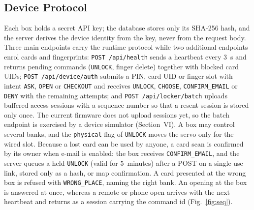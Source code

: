 \documentclass[journal,onecolumn]{IEEEtran}
\begin{document}
\subsection{Device Protocol}

Each box holds a secret API key; the database stores only its SHA-256 hash, and the server derives the device
identity from the key, never from the request body. Three main endpoints carry the runtime protocol while two additional
endpoints enrol cards and fingerprints: \texttt{POST /api/health} sends a heartbeat every 3~s and returns pending
commands (\texttt{UNLOCK}, finger delete) together with blocked card UIDs; \texttt{POST /api/device/auth} submits a PIN,
card UID or finger slot with intent \texttt{ASK}, \texttt{OPEN} or \texttt{CHECKOUT} and receives \texttt{UNLOCK},
\texttt{CHOOSE}, \texttt{CONFIRM\_EMAIL} or \texttt{DENY} with the remaining attempts; and
\texttt{POST /api/locker/batch} uploads buffered access sessions with a sequence number so that a resent session is
stored only once. The current firmware does not upload sessions yet, so the batch endpoint is exercised by a device
simulator (Section~VI). A box may control several banks, and the \texttt{physical} flag of \texttt{UNLOCK} moves the
servo only for the wired slot. Because a lost card can be used by anyone, a card scan is confirmed by its owner when
e-mail is enabled: the box receives \texttt{CONFIRM\_EMAIL}, and the server queues a held \texttt{UNLOCK} (valid for
5~minutes) after a POST on a single-use link, stored only as a hash, or map confirmation. A card presented at the wrong
box is refused with \texttt{WRONG\_PLACE}, naming the right bank. An opening at the box is answered at once, whereas a
remote or phone open arrives with the next heartbeat and returns as a session carrying the command id
(Fig.~\ref{fig:seq}).
\end{document}
